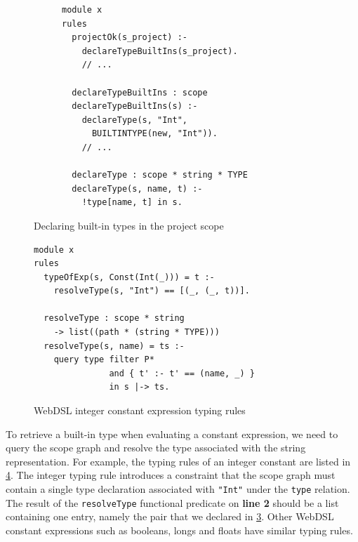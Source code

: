       \begin{figure}[h]
        \begin{subfigure}[b]{0.5\textwidth}
          \begin{verbatim}
module x
rules
  projectOk(s_project) :- 
    declareTypeBuiltIns(s_project).
    // ...

  declareTypeBuiltIns : scope
  declareTypeBuiltIns(s) :-
    declareType(s, "Int", 
      BUILTINTYPE(new, "Int")).
    // ...

  declareType : scope * string * TYPE
  declareType(s, name, t) :-
    !type[name, t] in s.
          \end{verbatim}
          \vspace{-10pt}
          \caption{\label{fig:webdsl-basics-built-in-types-decl-stx}}
        \end{subfigure}
        \begin{subfigure}[b]{0.5\textwidth}
          \centering
          \caption{\label{fig:webdsl-basics-built-in-types-decl-sg}}
        \end{subfigure}
        \caption{\label{fig:webdsl-basics-built-in-types-decl}Declaring built-in types in the project scope}
      \end{figure}

      \begin{figure}
        \capstart
        \begin{verbatim}
module x
rules
  typeOfExp(s, Const(Int(_))) = t :-
    resolveType(s, "Int") == [(_, (_, t))].

  resolveType : scope * string
    -> list((path * (string * TYPE)))
  resolveType(s, name) = ts :-
    query type filter P*
               and { t' :- t' == (name, _) }
               in s |-> ts.
        \end{verbatim}
        \caption{\label{fig:webdsl-basics-built-in-types-query}WebDSL integer constant expression typing rules}
      \end{figure}

      To retrieve a built-in type when evaluating a constant expression, we need to query the scope graph and resolve the type associated with the string representation. For example, the typing rules of an integer constant are listed in \cref{fig:webdsl-basics-built-in-types-query}. The integer typing rule introduces a constraint that the scope graph must contain a single type declaration associated with \texttt{"Int"} under the \texttt{type} relation. The result of the \texttt{resolveType} functional predicate on \textbf{line 2} should be a list containing one entry, namely the pair that we declared in \cref{fig:webdsl-basics-built-in-types-decl}. Other WebDSL constant expressions such as booleans, longs and floats have similar typing rules.

